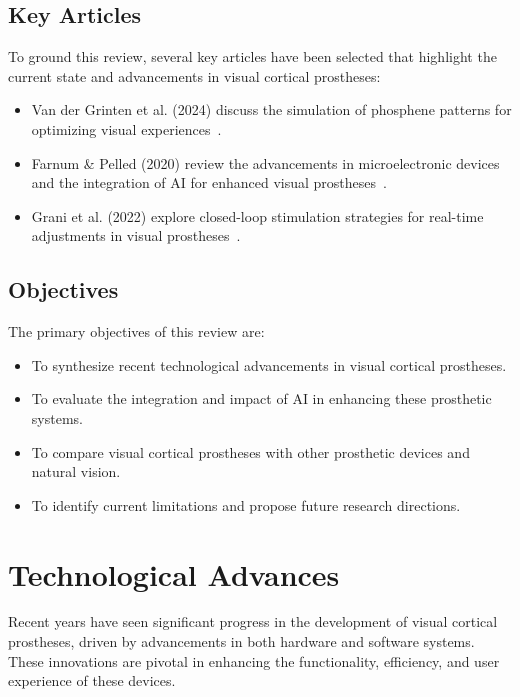 \documentclass[twocolumn,10pt]{article}
\begin{document}
\subsection*{Key Articles}\label{sec:key_articles}
To ground this review, several key articles have been selected that highlight
the current state and advancements in visual cortical prostheses:
\begin{itemize}
      \item Van der Grinten et al. (2024) discuss the simulation of phosphene
            patterns for optimizing visual
            experiences~\parencite{vandergrintenBiologicallyPlausiblePhosphene2024}.
      \item Farnum \& Pelled (2020) review the advancements in microelectronic
            devices and the integration of AI for enhanced visual
            prostheses~\parencite{farnumNewVisionVisual2020}.
      \item Grani et al. (2022) explore closed-loop stimulation strategies for
            real-time adjustments in visual
            prostheses~\parencite{graniPersonalizedClosedloopStimulation2022}.
\end{itemize}

\subsection*{Objectives}\label{sec:objectives}
The primary objectives of this review are:
\begin{itemize}
      \item To synthesize recent technological advancements in visual cortical
            prostheses.
      \item To evaluate the integration and impact of AI in enhancing these
            prosthetic systems.
      \item To compare visual cortical prostheses with other prosthetic devices
            and natural vision.
      \item To identify current limitations and propose future research
            directions.
\end{itemize}

\section*{Technological Advances}\label{sec:tech_advances}
Recent years have seen significant progress in the development of visual
cortical prostheses, driven by advancements in both hardware and software
systems. These innovations are pivotal in enhancing the functionality,
efficiency, and user experience of these devices.
\end{document}

